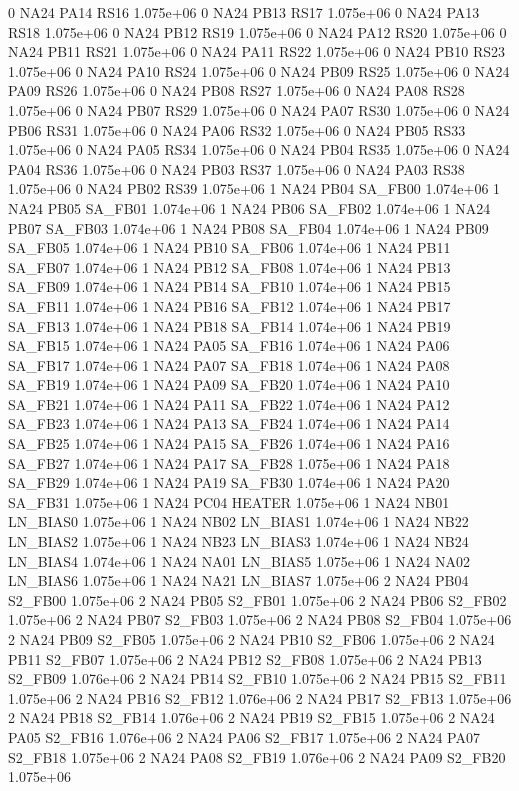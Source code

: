 0 NA24 PA14 RS16 1.075e+06 
0 NA24 PB13 RS17 1.075e+06 
0 NA24 PA13 RS18 1.075e+06 
0 NA24 PB12 RS19 1.075e+06 
0 NA24 PA12 RS20 1.075e+06 
0 NA24 PB11 RS21 1.075e+06 
0 NA24 PA11 RS22 1.075e+06 
0 NA24 PB10 RS23 1.075e+06 
0 NA24 PA10 RS24 1.075e+06 
0 NA24 PB09 RS25 1.075e+06 
0 NA24 PA09 RS26 1.075e+06 
0 NA24 PB08 RS27 1.075e+06 
0 NA24 PA08 RS28 1.075e+06 
0 NA24 PB07 RS29 1.075e+06 
0 NA24 PA07 RS30 1.075e+06 
0 NA24 PB06 RS31 1.075e+06 
0 NA24 PA06 RS32 1.075e+06 
0 NA24 PB05 RS33 1.075e+06 
0 NA24 PA05 RS34 1.075e+06 
0 NA24 PB04 RS35 1.075e+06 
0 NA24 PA04 RS36 1.075e+06 
0 NA24 PB03 RS37 1.075e+06 
0 NA24 PA03 RS38 1.075e+06 
0 NA24 PB02 RS39 1.075e+06 
1 NA24 PB04 SA_FB00 1.074e+06 
1 NA24 PB05 SA_FB01 1.074e+06 
1 NA24 PB06 SA_FB02 1.074e+06 
1 NA24 PB07 SA_FB03 1.074e+06 
1 NA24 PB08 SA_FB04 1.074e+06 
1 NA24 PB09 SA_FB05 1.074e+06 
1 NA24 PB10 SA_FB06 1.074e+06 
1 NA24 PB11 SA_FB07 1.074e+06 
1 NA24 PB12 SA_FB08 1.074e+06 
1 NA24 PB13 SA_FB09 1.074e+06 
1 NA24 PB14 SA_FB10 1.074e+06 
1 NA24 PB15 SA_FB11 1.074e+06 
1 NA24 PB16 SA_FB12 1.074e+06 
1 NA24 PB17 SA_FB13 1.074e+06 
1 NA24 PB18 SA_FB14 1.074e+06 
1 NA24 PB19 SA_FB15 1.074e+06 
1 NA24 PA05 SA_FB16 1.074e+06 
1 NA24 PA06 SA_FB17 1.074e+06 
1 NA24 PA07 SA_FB18 1.074e+06 
1 NA24 PA08 SA_FB19 1.074e+06 
1 NA24 PA09 SA_FB20 1.074e+06 
1 NA24 PA10 SA_FB21 1.074e+06 
1 NA24 PA11 SA_FB22 1.074e+06 
1 NA24 PA12 SA_FB23 1.074e+06 
1 NA24 PA13 SA_FB24 1.074e+06 
1 NA24 PA14 SA_FB25 1.074e+06 
1 NA24 PA15 SA_FB26 1.074e+06 
1 NA24 PA16 SA_FB27 1.074e+06 
1 NA24 PA17 SA_FB28 1.075e+06 
1 NA24 PA18 SA_FB29 1.074e+06 
1 NA24 PA19 SA_FB30 1.074e+06 
1 NA24 PA20 SA_FB31 1.075e+06 
1 NA24 PC04 HEATER 1.075e+06 
1 NA24 NB01 LN_BIAS0 1.075e+06 
1 NA24 NB02 LN_BIAS1 1.074e+06 
1 NA24 NB22 LN_BIAS2 1.075e+06 
1 NA24 NB23 LN_BIAS3 1.074e+06 
1 NA24 NB24 LN_BIAS4 1.074e+06 
1 NA24 NA01 LN_BIAS5 1.075e+06 
1 NA24 NA02 LN_BIAS6 1.075e+06 
1 NA24 NA21 LN_BIAS7 1.075e+06 
2 NA24 PB04 S2_FB00 1.075e+06 
2 NA24 PB05 S2_FB01 1.075e+06 
2 NA24 PB06 S2_FB02 1.075e+06 
2 NA24 PB07 S2_FB03 1.075e+06 
2 NA24 PB08 S2_FB04 1.075e+06 
2 NA24 PB09 S2_FB05 1.075e+06 
2 NA24 PB10 S2_FB06 1.075e+06 
2 NA24 PB11 S2_FB07 1.075e+06 
2 NA24 PB12 S2_FB08 1.075e+06 
2 NA24 PB13 S2_FB09 1.076e+06 
2 NA24 PB14 S2_FB10 1.075e+06 
2 NA24 PB15 S2_FB11 1.075e+06 
2 NA24 PB16 S2_FB12 1.076e+06 
2 NA24 PB17 S2_FB13 1.075e+06 
2 NA24 PB18 S2_FB14 1.076e+06 
2 NA24 PB19 S2_FB15 1.075e+06 
2 NA24 PA05 S2_FB16 1.076e+06 
2 NA24 PA06 S2_FB17 1.075e+06 
2 NA24 PA07 S2_FB18 1.075e+06 
2 NA24 PA08 S2_FB19 1.076e+06 
2 NA24 PA09 S2_FB20 1.075e+06 
